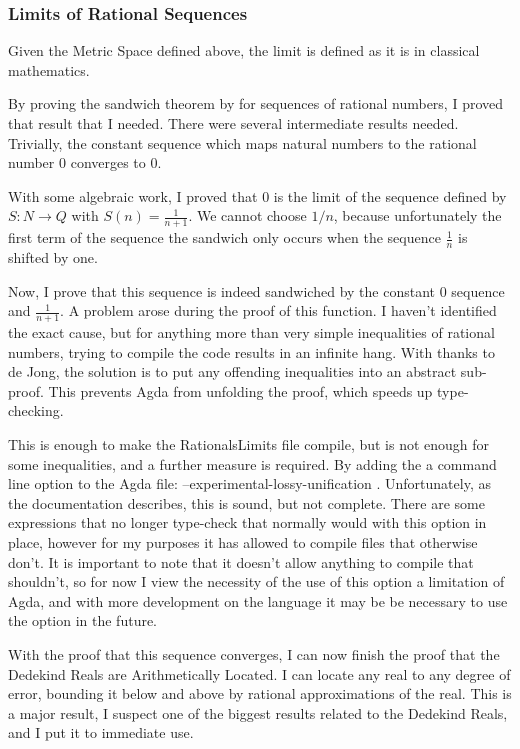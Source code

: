 \documentclass[ProjectReport]{subfiles}
\begin{document}
\subsubsection{Limits of Rational Sequences}

Given the Metric Space defined above, the limit is defined as it is in classical mathematics. 


By proving the sandwich theorem by for sequences of rational numbers, I proved that result that I needed. There were several intermediate results needed. Trivially, the constant sequence which maps natural numbers to the rational number $0$ converges to $0$. 


With some algebraic work, I proved that $0$ is the limit of the sequence defined by $S : N \to Q$ with $S(n) = \frac{1}{n+1}$. We cannot choose $1/n$, because unfortunately the first term of the sequence the sandwich only occurs when the sequence $\frac{1}{n}$ is shifted by one.


Now, I prove that this sequence is indeed sandwiched by the constant $0$ sequence and $\frac{1}{n+1}$. A problem arose during the proof of this function. I haven't identified the exact cause, but for anything more than very simple inequalities of rational numbers, trying to compile the code results in an infinite hang. With thanks to de Jong, the solution is to put any offending inequalities into an abstract sub-proof. This prevents Agda from unfolding the proof, which speeds up type-checking. 

This is enough to make the RationalsLimits file compile, but is not enough for some inequalities, and a further measure is required. By adding the a command line option to the Agda file: --experimental-lossy-unification \cite{lossy_unification}. Unfortunately, as the documentation describes, this is sound, but not complete. There are some expressions that no longer type-check that normally would with this option in place, however for my purposes it has allowed to compile files that otherwise don't. It is important to note that it doesn't allow anything to compile that shouldn't, so for now I view the necessity of the use of this option a limitation of Agda, and with more development on the language it may be be necessary to use the option in the future.

With the proof that this sequence converges, I can now finish the proof that the Dedekind Reals are Arithmetically Located. I can locate any real to any degree of error, bounding it below and above by rational approximations of the real. This is a major result, I suspect one of the biggest results related to the Dedekind Reals, and I put it to immediate use.
\end{document}
